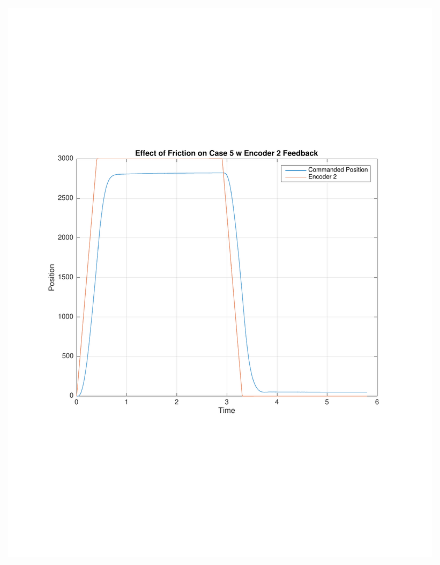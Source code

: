 \documentclass[11pt, a4paper]{article}
\begin{document}
\begin{figure}[H]
\centering
\includegraphics[width = \textwidth]{5_fric.pdf}
\end{figure}
\end{document}
